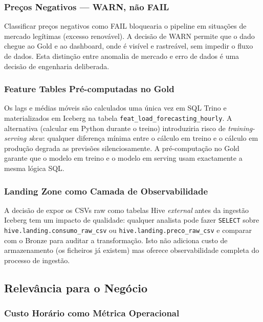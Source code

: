 \documentclass[11pt,a4paper]{article}
\begin{document}
\subsubsection{Preços Negativos — WARN, não FAIL}

Classificar preços negativos como FAIL bloquearia o pipeline em situações de mercado legítimas (excesso renovável). A decisão de WARN permite que o dado chegue ao Gold e ao dashboard, onde é visível e rastreável, sem impedir o fluxo de dados. Esta distinção entre anomalia de mercado e erro de dados é uma decisão de engenharia deliberada.

\subsubsection{Feature Tables Pré-computadas no Gold}

Os lags e médias móveis são calculados uma única vez em SQL Trino e materializados em Iceberg na tabela \texttt{feat\_load\_forecasting\_hourly}. A alternativa (calcular em Python durante o treino) introduziria risco de \textit{training-serving skew}: qualquer diferença mínima entre o cálculo em treino e o cálculo em produção degrada as previsões silenciosamente. A pré-computação no Gold garante que o modelo em treino e o modelo em serving usam exactamente a mesma lógica SQL.

\subsubsection{Landing Zone como Camada de Observabilidade}

A decisão de expor os CSVs raw como tabelas Hive \textit{external} antes da ingestão Iceberg tem um impacto de qualidade: qualquer analista pode fazer \texttt{SELECT} sobre \texttt{hive.landing.consumo\_raw\_csv} ou \texttt{hive.landing.preco\_raw\_csv} e comparar com o Bronze para auditar a transformação. Isto não adiciona custo de armazenamento (os ficheiros já existem) mas oferece observabilidade completa do processo de ingestão.

\subsection{Relevância para o Negócio}

\subsubsection{Custo Horário como Métrica Operacional}
\end{document}
